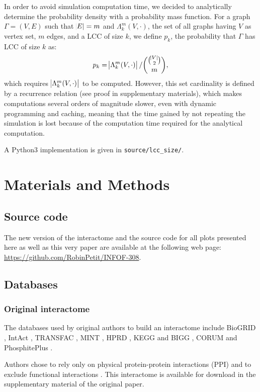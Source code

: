 \documentclass[letterpaper]{article}
\begin{document}
In order to avoid simulation computation time, we decided to analytically determine the probability density
with a probability mass function. For a graph $\Gamma = (V, E)$ such that $\abs E = m$ and
$\Lambda_k^m(V, \cdot)$, the set of all graphs having $V$ as vertex set, $m$ edges, and a LCC of size $k$,
we define $p_k$, the probability that $\Gamma$ has LCC of size $k$ as:
\begin{equation}
	p_k = \abs {\Lambda_k^m(V, \cdot)}/\binom {\binom {\abs V}2}m,
\end{equation}
which requires $\abs {\Lambda_k^m(V, \cdot)}$ to be computed. However, this set cardinality is defined by a
recurrence relation (see proof in supplementary materials), which makes computations several orders of
magnitude slower, even with dynamic programming and caching, meaning that the time gained by not repeating
the simulation is lost because of the computation time required for the analytical computation.

A Python3 implementation is given in \texttt{source/lcc\_size/}.

\section{Materials and Methods}
	\subsection{Source code}
	The new version of the interactome and the source code for all plots presented here as well as this
	very paper are available at the following web page: \url{https://github.com/RobinPetit/INFOF-308}.

	\subsection{Databases}
		\subsubsection{Original interactome}
		The databases used by original authors to build an interactome include BioGRID \citep{chatr2017biogrid},
		IntAct \citep{kerrien2011intact}, TRANSFAC \citep{matys2003transfac}, MINT \citep{licata2011mint}, HPRD
		\citep{keshava2008HPRD}, KEGG and BIGG \citep{lee2008KEGG-BIGG}, CORUM \citep{ruepp2009corum} and
		PhosphitePlus \citep{hornbeck2011phosphositeplus}.

		Authors chose to rely only on physical protein-protein interactions (PPI) and to exclude functional
		interactions \citep{caldera2017interactome}. This interactome is available for download in the
		supplementary material of the original paper.
\end{document}
